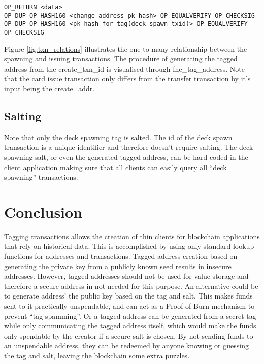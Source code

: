 \documentclass[a4paper,10pt]{article}
\begin{document}
\begin{scriptsize}\begin{verbatim}
OP_RETURN <data>
OP_DUP OP_HASH160 <change_address_pk_hash> OP_EQUALVERIFY OP_CHECKSIG
OP_DUP OP_HASH160 <pk_hash_for_tag(deck_spawn_txid)> OP_EQUALVERIFY OP_CHECKSIG
\end{verbatim}\end{scriptsize}

Figure \ref{fig:txn_relations} illustrates the one-to-many relationship between the spawning and issuing transactions.
The procedure of generating the tagged address from the create\_txn\_id is visualised through fnc\_tag\_address.
Note that the card issue transaction only differs from the transfer transaction by it's input being the create\_addr.


\subsection{Salting}
Note that only the deck spawning tag is salted. The id of the deck spawn transaction is a unique identifier and therefore doesn't require salting.
The deck spawning salt, or even the generated tagged address, can be hard coded in the client application making sure that all clients can easily query all ``deck spawning'' transactions.


\section{Conclusion}
Tagging transactions allows the creation of thin clients for blockchain applications that rely on historical data.
This is accomplished by using only standard lookup functions for addresses and transactions.
Tagged address creation based on generating the private key from a publicly known seed results in insecure addresses.
However, tagged addresses should not be used for value storage and therefore a secure address in not needed for this purpose.
An alternative could be to generate address' the public key based on the tag and salt.
This makes funds sent to it practically unspendable, and can act as a Proof-of-Burn mechanism to prevent ``tag spamming''.
Or a tagged address can be generated from a secret tag while only communicating the tagged address itself, which would make the funds only spendable by the creator if a secure salt is chosen.
By not sending funds to an unspendable address, they can be redeemed by anyone knowing or guessing the tag and salt, leaving the blockchain some extra puzzles.
\end{document}

